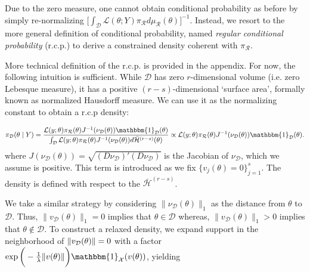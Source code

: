 \documentclass[10pt,fleqn]{article} \pdfoutput=1
\DeclareMathOperator{\1}{\mathbbm{1}} \DeclareMathOperator{\bigO}{\mc O}
\begin{document}
Due to the zero measure, one cannot obtain
conditional probability as before by simply re-normalizing
$\big[\int_\mathcal{D}\mathcal{L}(\theta;Y)\pi_\mathcal{R}d\mu_\mathcal{R}(\theta)\big]^{-1}.$
Instead, we resort to the more general definition of conditional probability,
named \emph{regular conditional probability} (r.c.p.)
\citep{kolmogorov1950foundations} to derive a constrained density
coherent with $\pi_\mathcal{R}.$ 

More technical definition of the r.c.p. is provided in the appendix. For now, the
following intuition is sufficient. While $\mathcal{D}$ has zero
$r$-dimensional volume
(i.e. zero Lebesque measure), it has a positive $(r-s)$-dimensional
`surface area', formally known as normalized Hausdorff measure. We can use
it as the normalizing constant to obtain a r.c.p density:

$$\pi_{\mc D}(\theta \mid Y) = \dfrac{
	{\mathcal{L}(y;\theta)\pi_\mathcal{R}(\theta)}{J^{-1}(\nu_\mathcal{D}(\theta))
		\mathbbm{1}_{\mc D}(\theta)
	}
	} {\int_\mathcal{D}
	{\mathcal{L}(y;\theta)\pi_\mathcal{R}(\theta)}{J^{-1}(\nu_\mathcal{D}(\theta))}
d\bar{\mathcal{H}}^{(r-s)}(\theta)}
\propto 
	{\mathcal{L}(y;\theta)\pi_\mathcal{R}(\theta)}{J^{-1}(\nu_\mathcal{D}(\theta))
		\mathbbm{1}_{\mc D}(\theta)
	}.
	$$ 
where $J(\nu_\mathcal{D}(\theta)) =
	\sqrt{(D\nu_\mathcal{D})'(D\nu_\mathcal{D})}$ is the Jacobian of
	$\nu_\mathcal{D}$, which we assume is positive. This term is
	introduced as we fix $\{v_j(\theta)=0\}_{j=1}^{s}$.
	The density is
	defined with respect to the $\bar{\mathcal{H}}^{(r-s)}$.

We take a similar strategy by considering
$\|\nu_\mathcal{D}(\theta)\|_1$ as the distance from $\theta$ to
$\mathcal{D}.$ Thus, $\|v_\mathcal{D}(\theta)\|_1 =
	0$ implies that $\theta \in \mathcal{D}$ whereas,
$\|v_\mathcal{D}(\theta)\|_1 >0$ implies that $\theta\notin\mathcal{D}.$
To construct a relaxed density, we expand support in the neighborhood of
$\|v_{\mathcal{D}}(\theta)\|=0$ with a factor
$\exp\bigg(-\frac{1}{\lambda}\|v(\theta)\|\bigg)
\mathbbm{1}_{\mc X}(v(\theta))$, yielding
\end{document}
